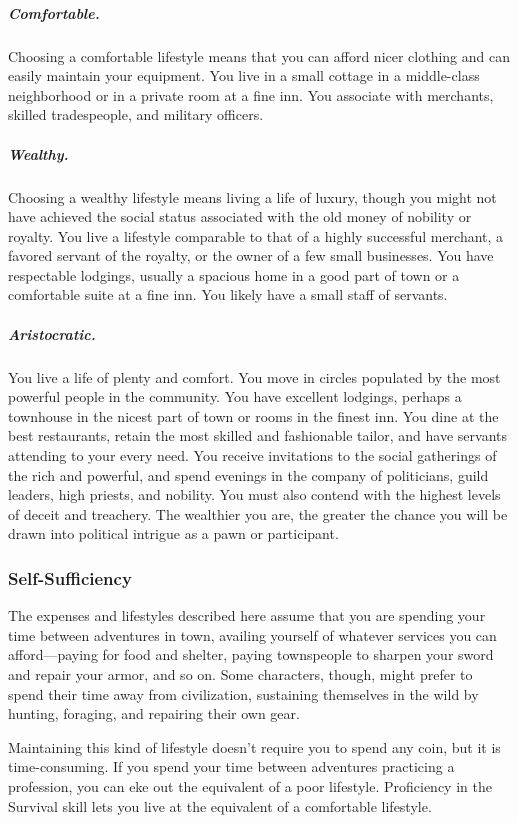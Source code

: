 \subparagraph*{Comfortable.} Choosing a comfortable lifestyle means that you can afford nicer clothing and can easily maintain your equipment. You live in a small cottage in a middle-class neighborhood or in a private room at a fine inn. You associate with merchants, skilled tradespeople, and military officers.

\subparagraph*{Wealthy.} Choosing a wealthy lifestyle means living a life of luxury, though you might not have achieved the social status associated with the old money of nobility or royalty. You live a lifestyle comparable to that of a highly successful merchant, a favored servant of the royalty, or the owner of a few small businesses. You have respectable lodgings, usually a spacious home in a good part of town or a comfortable suite at a fine inn. You likely have a small staff of servants.

\subparagraph*{Aristocratic.} You live a life of plenty and comfort. You move in circles populated by the most powerful people in the community. You have excellent lodgings, perhaps a townhouse in the nicest part of town or rooms in the finest inn. You dine at the best restaurants, retain the most skilled and fashionable tailor, and have servants attending to your every need. You receive invitations to the social gatherings of the rich and powerful, and spend evenings in the company of politicians, guild leaders, high priests, and nobility. You must also contend with the highest levels of deceit and treachery. The wealthier you are, the greater the chance you will be drawn into political intrigue as a pawn or participant.

\subsubsection{Self-Sufficiency}

The expenses and lifestyles described here assume that you are spending your time between adventures in town, availing yourself of whatever services you can afford—paying for food and shelter, paying townspeople to sharpen your sword and repair your armor, and so on. Some characters, though, might prefer to spend their time away from civilization, sustaining themselves in the wild by hunting, foraging, and repairing their own gear.

Maintaining this kind of lifestyle doesn't require you to spend any coin, but it is time-consuming. If you spend your time between adventures practicing a profession, you can eke out the equivalent of a poor lifestyle. Proficiency in the Survival skill lets you live at the equivalent of a comfortable lifestyle.

